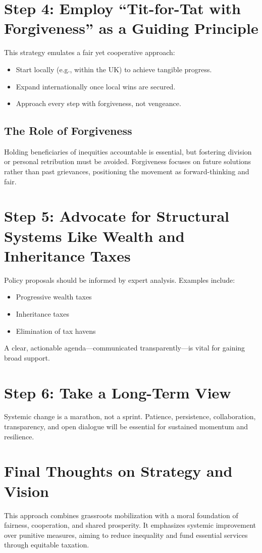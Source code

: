 \section{Step 4: Employ ``Tit-for-Tat with Forgiveness'' as a Guiding Principle}
This strategy emulates a fair yet cooperative approach:
\begin{itemize}
  \item Start locally (e.g., within the UK) to achieve tangible progress.
  \item Expand internationally once local wins are secured.
  \item Approach every step with forgiveness, not vengeance.
\end{itemize}

\subsection{The Role of Forgiveness}
Holding beneficiaries of inequities accountable is essential, but fostering division or personal retribution must be avoided. Forgiveness focuses on future solutions rather than past grievances, positioning the movement as forward-thinking and fair.

\section{Step 5: Advocate for Structural Systems Like Wealth and Inheritance Taxes}
Policy proposals should be informed by expert analysis. Examples include:
\begin{itemize}
  \item Progressive wealth taxes
  \item Inheritance taxes
  \item Elimination of tax havens
\end{itemize}
A clear, actionable agenda—communicated transparently—is vital for gaining broad support.

\section{Step 6: Take a Long-Term View}
Systemic change is a marathon, not a sprint. Patience, persistence, collaboration, transparency, and open dialogue will be essential for sustained momentum and resilience.

\section{Final Thoughts on Strategy and Vision}
This approach combines grassroots mobilization with a moral foundation of fairness, cooperation, and shared prosperity. It emphasizes systemic improvement over punitive measures, aiming to reduce inequality and fund essential services through equitable taxation.

